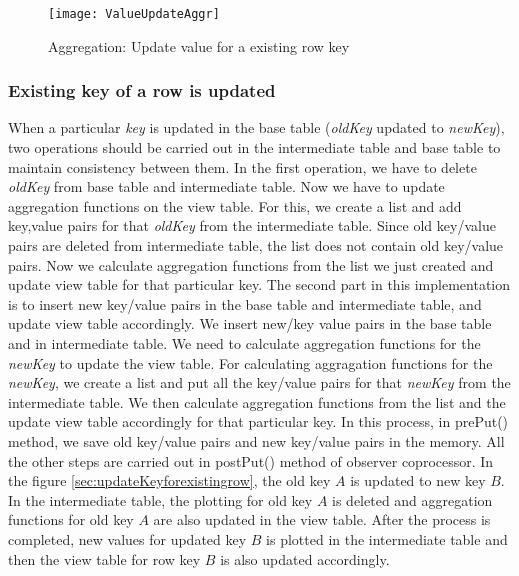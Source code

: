 \documentclass[11pt,a4paper,bibtotoc,idxtotoc,headsepline,footsepline,footexclude,BCOR12mm,DIV13]{scrbook}
\begin{document}
\begin{figure}
    \centering
    \texttt{[image: ValueUpdateAggr]}
    \caption{Aggregation: Update value for a existing row key}
    \label{sec:updatevalueforexistingkey}
    
\end{figure}  


\subsubsection{Existing key of a row is updated}
\label{subsubsec:keyupdate}

When a particular \emph{key} is updated in the base table (\emph{oldKey} updated to \emph{newKey}), two operations should be carried out in the intermediate table and base table to maintain consistency between them. In the first operation, we have to delete \emph{oldKey} from base table and intermediate table. Now we have to update aggregation functions on the view table. For this, we create a list and add key,value pairs for that \emph{oldKey} from the intermediate table. Since old key/value pairs are deleted from intermediate table, the list does not contain old key/value pairs. Now we calculate aggregation functions from the list we just created and update view table for that particular key. The second part in this implementation is to insert new key/value pairs in the base table and intermediate table, and update view table accordingly. We insert new/key value pairs in the base table and in intermediate table. We need to calculate aggregation functions for the \emph{newKey} to update the view table. For calculating aggragation functions for the \emph{newKey}, we create a list and put all the key/value pairs for that \emph{newKey} from the intermediate table. We then calculate aggregation functions from the list and the update view table accordingly for that particular key. In this process, in prePut() method, we save old key/value pairs and new key/value pairs in the memory. All the other steps are carried out in postPut() method of observer coprocessor. In the figure \ref{sec:updateKeyforexistingrow}, the old key $A$ is updated to new key $B$. In the intermediate table, the plotting for old key $A$ is deleted and aggregation functions for old key $A$ are also updated in the view table. After the process is completed, new values for updated key $B$ is plotted in the intermediate table and then the view table for row key $B$ is also updated accordingly.

\end{document}
